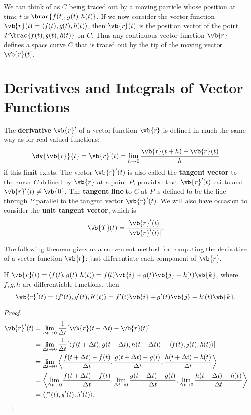 \begin{remark}
We can think of as $C$ being
traced out by a moving particle whose position at time $t$ is $\brac{f(t),g(t),h(t)}$. If we now consider the vector function $\vb{r}(t)=\langle f(t),g(t),h(t)\rangle$, then $\vb{r}(t)$ is the position vector of the point $P\brac{f(t),g(t),h(t)}$ on $C$. Thus any continuous vector function $\vb{r}$ defines a space curve $C$ that is traced out by the tip of the moving vector $\vb{r}(t)$.
\end{remark}

\section{Derivatives and Integrals of Vector Functions}
The \textbf{derivative} $\vb{r}^\prime$ of a vector function $\vb{r}$ is defined in much the same way as for real-valued functions:
\begin{equation}
\dv{\vb{r}}{t}=\vb{r}^\prime(t)=\lim_{h\to0}\frac{\vb{r}(t+h)-\vb{r}(t)}{h}
\end{equation}
if this limit exists. The vector $\vb{r}^\prime(t)$ is also called the \textbf{tangent vector} to the curve $C$ defined by $\vb{r}$ at a point $P$, provided that $\vb{r}^\prime(t)$ exists and $\vb{r}^\prime(t)\neq\vb{0}$. The \textbf{tangent line} to $C$ at $P$ is defined to be the line through $P$ parallel to the tangent vector $\vb{r}^\prime(t)$. We will also have occasion to consider the \textbf{unit tangent vector}, which is
\[\vb{T}(t)=\frac{\vb{r}^\prime(t)}{|\vb{r}^\prime(t)|}.\]

The following theorem gives us a convenient method for computing the derivative of a vector function $\vb{r}$: just differentiate each component of $\vb{r}$.

\begin{theorem}
If $\vb{r}(t)=\langle f(t),g(t),h(t)\rangle=f(t)\vb{i}+g(t)\vb{j}+h(t)\vb{k}$, where $f,g,h$ are differentiable functions, then
\[\vb{r}^\prime(t)=\langle f^\prime(t),g^\prime(t),h^\prime(t)\rangle=f^\prime(t)\vb{i}+g^\prime(t)\vb{j}+h^\prime(t)\vb{k}.\]
\end{theorem}

\begin{proof}
\begin{align*}
\vb{r}^\prime(t)&=\lim_{\Delta t\to0}\frac{1}{\Delta t}[\vb{r}(t+\Delta t)-\vb{r}(t)]\\
&=\lim_{\Delta t\to0}\frac{1}{\Delta t}[\langle f(t+\Delta t),g(t+\Delta t),h(t+\Delta t)\rangle-\langle f(t),g(t),h(t)\rangle]\\
&=\lim_{\Delta t\to0}\left\langle\frac{f(t+\Delta t)-f(t)}{\Delta t},\frac{g(t+\Delta t)-g(t)}{\Delta t},\frac{h(t+\Delta t)-h(t)}{\Delta t}\right\rangle\\
&=\left\langle\lim_{\Delta t\to0}\frac{f(t+\Delta t)-f(t)}{\Delta t},\lim_{\Delta t\to0}\frac{g(t+\Delta t)-g(t)}{\Delta t},\lim_{\Delta t\to0}\frac{h(t+\Delta t)-h(t)}{\Delta t}\right\rangle\\
&=\langle f^\prime(t),g^\prime(t),h^\prime(t)\rangle.
\end{align*}
\end{proof}

